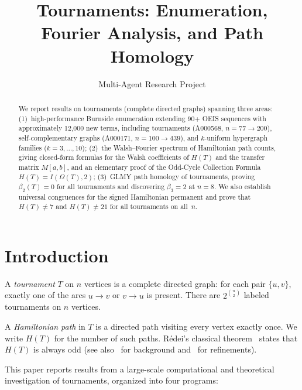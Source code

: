 \documentclass[12pt,reqno]{amsart}
\title{Tournaments: Enumeration, Fourier Analysis, and Path Homology}
\author{Multi-Agent Research Project}
\theoremstyle{plain}
\theoremstyle{definition}
\theoremstyle{remark}
\begin{document}
\begin{abstract}
We report results on tournaments (complete directed graphs) spanning three areas:
(1)~high-performance Burnside enumeration extending 90+ OEIS sequences with
approximately 12{,}000 new terms, including tournaments (A000568, $n=77 \to 200$),
self-complementary graphs (A000171, $n=100 \to 439$), and
$k$-uniform hypergraph families ($k = 3, \ldots, 10$);
(2)~the Walsh--Fourier spectrum of Hamiltonian path counts, giving closed-form
formulas for the Walsh coefficients of $H(T)$ and the transfer matrix $M[a,b]$,
and an elementary proof of the Odd-Cycle Collection Formula
$H(T) = I(\Omega(T), 2)$;
(3)~GLMY path homology of tournaments, proving $\beta_2(T) = 0$ for all tournaments
and discovering $\beta_3 = 2$ at $n = 8$.
We also establish universal congruences for the signed Hamiltonian permanent
and prove that $H(T) \neq 7$ and $H(T) \neq 21$ for all tournaments on all~$n$.
\end{abstract}

\maketitle
\tableofcontents

\section{Introduction}

A \emph{tournament} $T$ on $n$ vertices is a complete directed graph: for each
pair $\{u, v\}$, exactly one of the arcs $u \to v$ or $v \to u$ is present.
There are $2^{\binom{n}{2}}$ labeled tournaments on $n$ vertices.

A \emph{Hamiltonian path} in $T$ is a directed path visiting every vertex
exactly once. We write $H(T)$ for the number of such paths. R\'edei's classical
theorem~\cite{Redei1934} states that $H(T)$ is always odd
(see also~\cite{Moon1968} for background and~\cite{Forcade1973, ElSahili2020, SchweserStiebitzToft2025} for refinements).

This paper reports results from a large-scale computational and theoretical
investigation of tournaments, organized into four programs:
\end{document}
